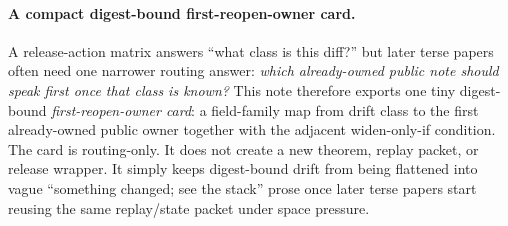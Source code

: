 \documentclass[11pt]{article}
\begin{document}
\paragraph{A compact digest-bound first-reopen-owner card.}
A release-action matrix answers ``what class is this diff?'' but later terse papers often need one narrower routing answer: \emph{which already-owned public note should speak first once that class is known?}
This note therefore exports one tiny digest-bound \emph{first-reopen-owner card}: a field-family map from drift class to the first already-owned public owner together with the adjacent widen-only-if condition.
The card is routing-only.
It does not create a new theorem, replay packet, or release wrapper.
It simply keeps digest-bound drift from being flattened into vague ``something changed; see the stack'' prose once later terse papers start reusing the same replay/state packet under space pressure.
\end{document}
